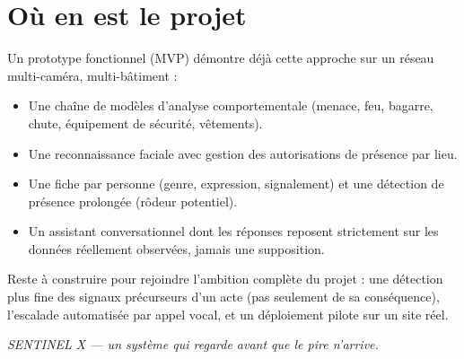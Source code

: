 \documentclass[11pt,a4paper]{article}
\begin{document}
\section{Où en est le projet}
Un prototype fonctionnel (MVP) démontre déjà cette approche sur un réseau multi-caméra, multi-bâtiment :

\begin{itemize}[leftmargin=1.4em, itemsep=2pt]
  \item Une chaîne de modèles d'analyse comportementale (menace, feu, bagarre, chute, équipement de sécurité, vêtements).
  \item Une reconnaissance faciale avec gestion des autorisations de présence par lieu.
  \item Une fiche par personne (genre, expression, signalement) et une détection de présence prolongée (rôdeur potentiel).
  \item Un assistant conversationnel dont les réponses reposent strictement sur les données réellement observées, jamais une supposition.
\end{itemize}

Reste à construire pour rejoindre l'ambition complète du projet : une détection plus fine des signaux précurseurs d'un acte (pas seulement de sa conséquence), l'escalade automatisée par appel vocal, et un déploiement pilote sur un site réel.

\vspace{1em}
\noindent\textit{SENTINEL X --- un système qui regarde avant que le pire n'arrive.}
\end{document}
